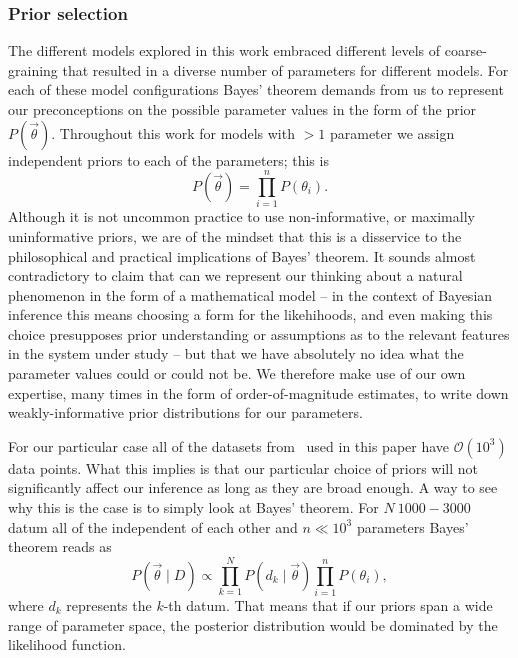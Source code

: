 \subsubsection{Prior selection}
The different models explored in this work embraced different levels of
coarse-graining that resulted in a diverse number of parameters for different
models. For each of these model configurations Bayes' theorem demands from us to
represent our preconceptions on the possible parameter values in the form of the
prior $P(\vec{\theta})$. Throughout this work for models with $> 1$ parameter we
assign independent priors to each of the parameters; this is
\begin{equation}
P(\vec{\theta}) = \prod_{i=1}^n P(\theta_i).
\end{equation}
Although it is not uncommon practice to use non-informative, or maximally
uninformative priors, we are of the mindset that this is a disservice to the
philosophical and practical implications of Bayes' theorem. It sounds almost
contradictory to claim that can we represent our thinking about a natural
phenomenon in the form of a mathematical model -- in the context of Bayesian
inference this means choosing a form for the likehihoods, and even making
this choice presupposes prior understanding or assumptions as to the
relevant features in the system under study -- but that we have absolutely
no idea what the parameter values could or could not be. We therefore make
use of our own expertise, many times in the form of order-of-magnitude
estimates, to write down weakly-informative prior distributions
for our parameters.

For our particular case all of the datasets from~\cite{Jones2014} used in this
paper have $\mathcal{O}(10^3)$ data points. What this implies is that our
particular choice of priors will not significantly affect our inference as long
as they are broad enough. A way to see why this is the case is to simply look at
Bayes' theorem. For $N ~ 1000-3000$ datum all of the independent of each other
and $n \ll 10^3$ parameters Bayes' theorem reads as
\begin{equation}
P(\vec{\theta} \mid D) \propto \prod_{k=1}^{N} P(d_k \mid \vec{\theta})
\prod_{i=1}^n P(\theta_i),
\end{equation}
where $d_k$ represents the $k$-th datum. That means that if our priors span a
wide range of parameter space, the posterior distribution would be dominated by
the likelihood function.

